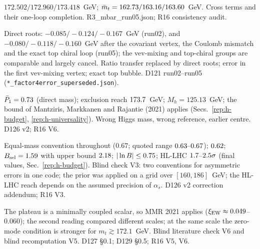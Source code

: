 \begin{description}
{$172.502/\allowbreak 172.960/\allowbreak 173.418$~GeV; $\bar m_t=162.73/\allowbreak 163.16/\allowbreak 163.60$~GeV.}
{Cross terms and their one-loop completion.}
{R3\_mbar\_run05.json; R16 consistency audit.}

{Direct roots: $-0.085/\allowbreak{-}0.124/\allowbreak{-}0.167$~GeV (run02), and $-0.080/\allowbreak{-}0.118/\allowbreak{-}0.160$~GeV after the covariant vertex, the Coulomb mismatch and the exact top chiral loop (run05); the vev-mixing and top-chiral groups are comparable and largely cancel.}
{Ratio transfer replaced by direct roots; error in the first vev-mixing vertex; exact top bubble.}
{D121 run02--run05 (\texttt{*\_factor4error\_superseded.json}).}

{$\bar P_1=0.73$ (direct mass); exclusion reach $173.7$~GeV; $M_h=125.13$~GeV; the bound of Mantziris, Markkanen and Rajantie (2021) applies (Secs.~\ref{rep:h-budget}, \ref{rep:h-universality}).}
{Wrong Higgs mass, wrong reference, earlier centre.}
{D126 v2; R16 V6.}

{Equal-mass convention throughout ($0.67$; quoted range $0.63\text{--}0.67$); $0.62$; $B_{\rm sel}=1.59$ with upper bound $2.18$; $|\ln B|\le0.75$; HL-LHC $1.7$--$2.5\sigma$ (final values, Sec.~\ref{rep:h-budget}).}
{Blind check V3: two conventions for asymmetric errors in one code; the prior was applied on a grid over $[160,186]$~GeV; the HL-LHC reach depends on the assumed precision of $\alpha_s$.}
{D126 v2 correction addendum; R16 V3.}

{The plateau is a minimally coupled scalar, so MMR 2021 applies ($\xi_{\rm EW}\approx0.049$--$0.060$); the second reading compared different scales; at the same scale the zero-mode condition is stronger for $m_t\gtrsim172.1$~GeV.}
{Blind literature check V6 and blind recomputation V5.}
{D127 \S0.1; D129 \S0.5; R16 V5, V6.}


\end{description}
